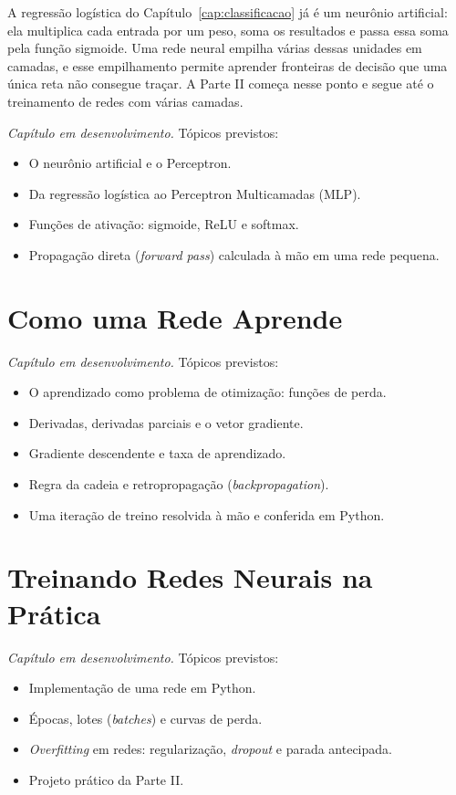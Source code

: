 \documentclass[a4paper,12pt,openany]{book}
\begin{document}
A regressão logística do Capítulo~\ref{cap:classificacao} já é um neurônio artificial: ela multiplica cada entrada por um peso, soma os resultados e passa essa soma pela função sigmoide. Uma rede neural empilha várias dessas unidades em camadas, e esse empilhamento permite aprender fronteiras de decisão que uma única reta não consegue traçar. A Parte II começa nesse ponto e segue até o treinamento de redes com várias camadas.

\textit{Capítulo em desenvolvimento.} Tópicos previstos:
\begin{itemize}
    \item O neurônio artificial e o Perceptron.
    \item Da regressão logística ao Perceptron Multicamadas (MLP).
    \item Funções de ativação: sigmoide, ReLU e softmax.
    \item Propagação direta (\textit{forward pass}) calculada à mão em uma rede pequena.
\end{itemize}

\chapter{Como uma Rede Aprende}\label{cap:backpropagation}

\textit{Capítulo em desenvolvimento.} Tópicos previstos:
\begin{itemize}
    \item O aprendizado como problema de otimização: funções de perda.
    \item Derivadas, derivadas parciais e o vetor gradiente.
    \item Gradiente descendente e taxa de aprendizado.
    \item Regra da cadeia e retropropagação (\textit{backpropagation}).
    \item Uma iteração de treino resolvida à mão e conferida em Python.
\end{itemize}

\chapter{Treinando Redes Neurais na Prática}\label{cap:treino_redes}

\textit{Capítulo em desenvolvimento.} Tópicos previstos:
\begin{itemize}
    \item Implementação de uma rede em Python.
    \item Épocas, lotes (\textit{batches}) e curvas de perda.
    \item \textit{Overfitting} em redes: regularização, \textit{dropout} e parada antecipada.
    \item Projeto prático da Parte II.
\end{itemize}
\end{document}
